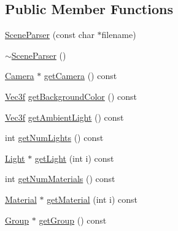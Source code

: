 \subsection*{Public Member Functions}
\begin{DoxyCompactItemize}
\item 
\hyperlink{classSceneParser_ad88a09b16ec8ebbe49a8fd70e14216cf}{Scene\+Parser} (const char $\ast$filename)
\item 
\hyperlink{classSceneParser_af5809864333132e558dc1627f39170fe}{$\sim$\+Scene\+Parser} ()
\item 
\hyperlink{classCamera}{Camera} $\ast$ \hyperlink{classSceneParser_a9fbeeca8f642f40ade54674a41265115}{get\+Camera} () const 
\item 
\hyperlink{classVec3f}{Vec3f} \hyperlink{classSceneParser_a4254064ea79ff601d72d77bc3affb131}{get\+Background\+Color} () const 
\item 
\hyperlink{classVec3f}{Vec3f} \hyperlink{classSceneParser_a057055897d67275f7057368e592e5cbe}{get\+Ambient\+Light} () const 
\item 
int \hyperlink{classSceneParser_a67cf28b4c397a1bd98d060ee0f35d80b}{get\+Num\+Lights} () const 
\item 
\hyperlink{classLight}{Light} $\ast$ \hyperlink{classSceneParser_a4a7c20035a7402eea1618118e873894f}{get\+Light} (int i) const 
\item 
int \hyperlink{classSceneParser_ae5c6cca64c7bd4f7b9b19c5bb381c801}{get\+Num\+Materials} () const 
\item 
\hyperlink{classMaterial}{Material} $\ast$ \hyperlink{classSceneParser_aadffb5793d5dc58507d20eabb617c6d6}{get\+Material} (int i) const 
\item 
\hyperlink{classGroup}{Group} $\ast$ \hyperlink{classSceneParser_ab7035d29d61e4dfdf64f1e1b4f157b54}{get\+Group} () const 
\end{DoxyCompactItemize}


